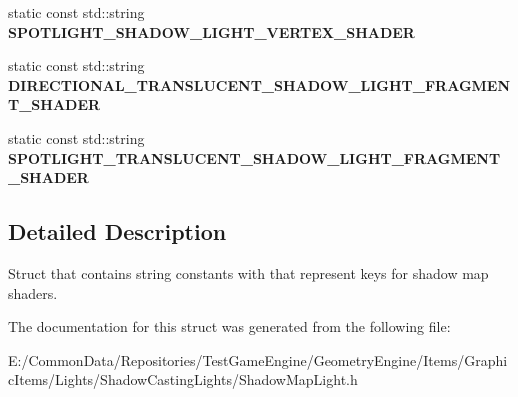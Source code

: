 \begin{DoxyCompactItemize}
\item 
\mbox{\label{struct_geometry_engine_1_1_geometry_world_item_1_1_geometry_light_1_1_shadow_map_constants_a1bfa357a028a17d5687ba9460220a1be}} 
static const std\+::string {\bfseries S\+P\+O\+T\+L\+I\+G\+H\+T\+\_\+\+S\+H\+A\+D\+O\+W\+\_\+\+L\+I\+G\+H\+T\+\_\+\+V\+E\+R\+T\+E\+X\+\_\+\+S\+H\+A\+D\+ER}
\item 
\mbox{\label{struct_geometry_engine_1_1_geometry_world_item_1_1_geometry_light_1_1_shadow_map_constants_a2f97f105a24e113c70832f14091123e9}} 
static const std\+::string {\bfseries D\+I\+R\+E\+C\+T\+I\+O\+N\+A\+L\+\_\+\+T\+R\+A\+N\+S\+L\+U\+C\+E\+N\+T\+\_\+\+S\+H\+A\+D\+O\+W\+\_\+\+L\+I\+G\+H\+T\+\_\+\+F\+R\+A\+G\+M\+E\+N\+T\+\_\+\+S\+H\+A\+D\+ER}
\item 
\mbox{\label{struct_geometry_engine_1_1_geometry_world_item_1_1_geometry_light_1_1_shadow_map_constants_add8ad5c8776d30f5226332d8b233cdd9}} 
static const std\+::string {\bfseries S\+P\+O\+T\+L\+I\+G\+H\+T\+\_\+\+T\+R\+A\+N\+S\+L\+U\+C\+E\+N\+T\+\_\+\+S\+H\+A\+D\+O\+W\+\_\+\+L\+I\+G\+H\+T\+\_\+\+F\+R\+A\+G\+M\+E\+N\+T\+\_\+\+S\+H\+A\+D\+ER}
\end{DoxyCompactItemize}


\subsection{Detailed Description}
Struct that contains string constants with that represent keys for shadow map shaders. 

The documentation for this struct was generated from the following file\+:\begin{DoxyCompactItemize}
\item 
E\+:/\+Common\+Data/\+Repositories/\+Test\+Game\+Engine/\+Geometry\+Engine/\+Items/\+Graphic\+Items/\+Lights/\+Shadow\+Casting\+Lights/Shadow\+Map\+Light.\+h\end{DoxyCompactItemize}
